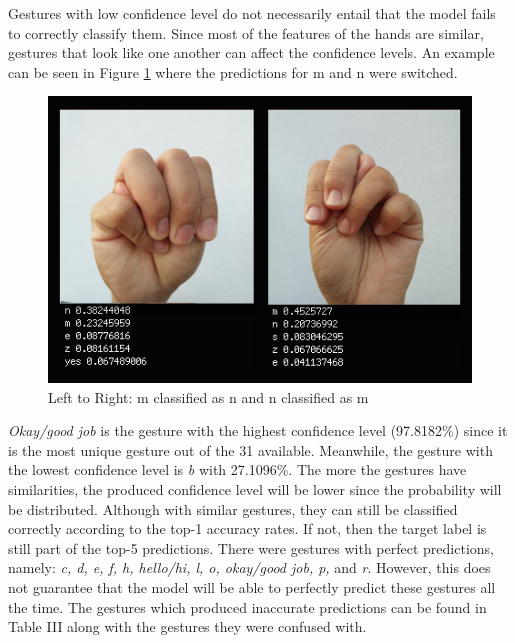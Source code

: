 \documentclass[journal]{./IEEE/IEEEtran}
\begin{document}
Gestures with low confidence level do not necessarily entail that the model fails to correctly classify them. Since most of the features of the hands are similar, gestures that look like one another can affect the confidence levels. An example can be seen in Figure \ref{fig:wrong_results} where the predictions for m and n were switched. 

\begin{figure}[ht!]
    \centering
    \includegraphics[width=1\linewidth]{./images/wrong_results.png}
    \caption{Left to Right: m classified as n and n classified as m}
    \label{fig:wrong_results}
\end{figure}

\indent \textit{Okay/good job} is the gesture with the highest confidence level (97.8182\%) since it is the most unique gesture out of the 31 available. Meanwhile, the gesture with the lowest confidence level is \textit{b} with 27.1096\%. The more the gestures have similarities, the produced confidence level will be lower since the probability will be distributed. Although with similar gestures, they can still be classified correctly according to the top-1 accuracy rates. If not, then the target label is still part of the top-5 predictions.
\newline
\indent There were gestures with perfect predictions, namely: \textit{c, d, e, f, h, hello/hi, l, o, okay/good job, p,} and \textit{r}. However, this does not guarantee that the model will be able to perfectly predict these gestures all the time. The gestures which produced inaccurate predictions can be found in Table III along with the gestures they were confused with.
\end{document}
